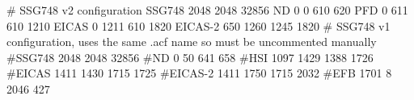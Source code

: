 # SSG748 v2 configuration
SSG748 2048 2048 32856
ND         0    0  610  620
PFD        0  611  610 1210
EICAS      0 1211  610 1820
EICAS-2  650 1260 1245 1820
# SSG748 v1 configuration, uses the same .acf name so must be uncommented manually
#SSG748 2048 2048 32856
#ND         0   50  641  658
#HSI     1097 1429 1388 1726
#EICAS   1411 1430 1715 1725
#EICAS-2 1411 1750 1715 2032
#EFB     1701    8 2046  427

